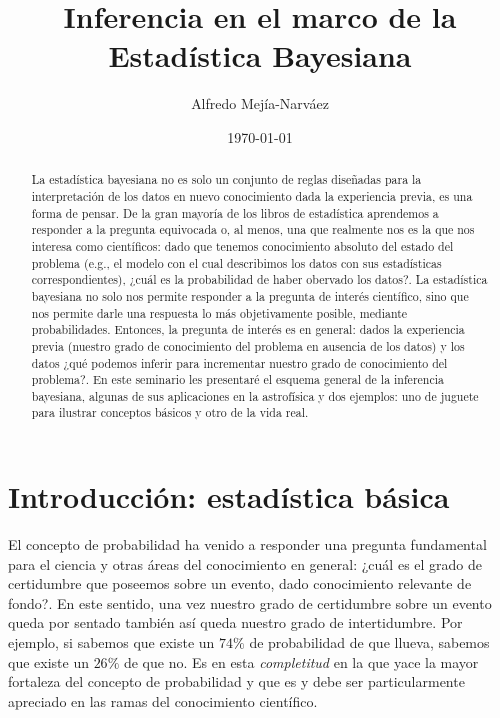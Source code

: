 \documentclass[a4paper,twoside]{article}
\title{Inferencia en el marco de la Estadística Bayesiana}
\author{Alfredo Mejía-Narváez}
\date{\today}
\begin{document}
\maketitle

\begin{abstract}
%
La estadística bayesiana no es solo un conjunto de reglas diseñadas para la interpretación de los
datos en nuevo conocimiento dada la experiencia previa, es una forma de pensar. De la gran mayoría
de los libros de estadística aprendemos a responder a la pregunta equivocada o, al menos, una que
realmente nos es la que nos interesa como científicos: dado que tenemos conocimiento absoluto del
estado del problema (e.g., el modelo con el cual describimos los datos con sus estadísticas
correspondientes), ¿cuál es la probabilidad de haber obervado los datos?. La estadística bayesiana
no solo nos permite responder a la pregunta de interés científico, sino que nos permite darle una
respuesta lo más objetivamente posible, mediante probabilidades. Entonces, la pregunta de interés es
en general: dados la experiencia previa (nuestro grado de conocimiento del problema en ausencia de
los datos) y los datos ¿qué podemos inferir para incrementar nuestro grado de conocimiento del
problema?. En este seminario les presentaré el esquema general de la inferencia bayesiana, algunas
de sus aplicaciones en la astrofísica y dos ejemplos: uno de juguete para ilustrar conceptos básicos
y otro de la vida real.
%
\end{abstract}

\section{Introducción: estadística básica}

El concepto de probabilidad ha venido a responder una pregunta fundamental para el ciencia y otras
áreas del conocimiento en general: ¿cuál es el grado de certidumbre que poseemos sobre un evento,
dado conocimiento relevante de fondo?. En este sentido, una vez nuestro grado de certidumbre sobre
un evento queda por sentado también así queda nuestro grado de intertidumbre. Por ejemplo, si
sabemos que existe un $74\%$ de probabilidad de que llueva, sabemos que existe un $26\%$ de que no.
Es en esta \emph{completitud} en la que yace la mayor fortaleza del concepto de probabilidad y que
es y debe ser particularmente apreciado en las ramas del conocimiento científico.
\end{document}
